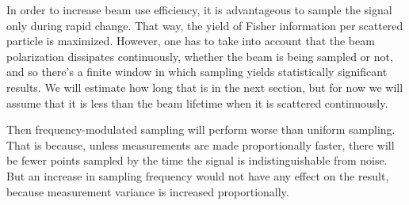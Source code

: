 \documentclass{article}
\begin{document}
In order to increase beam use efficiency, it is advantageous to sample the signal only during rapid change. That way, the yield of Fisher information per scattered particle is maximized. However, one has to take into account that the beam polarization dissipates continuously, whether the beam is being sampled or not, and so there's a finite window in which sampling yields statistically significant results. We will estimate how long that is in the next section, but for now we will assume that it is less than the beam lifetime when it is scattered continuously.

Then frequency-modulated sampling will perform worse than uniform sampling. That is because, unless measurements are made proportionally faster, there will be fewer points sampled by the time the signal is indistinguishable from noise. But an increase in sampling frequency would not have any effect on the result, because measurement variance is increased proportionally.
\end{document}
